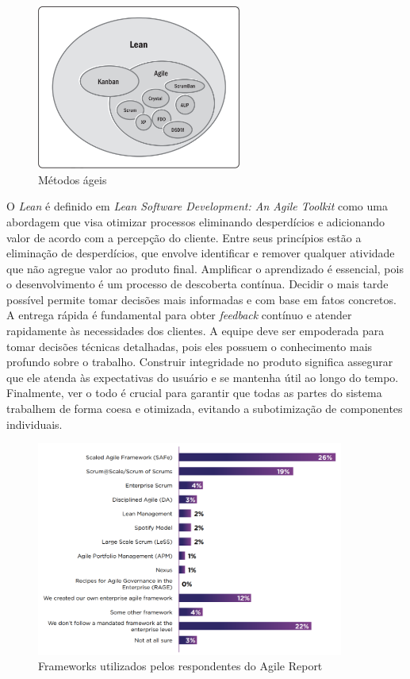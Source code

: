 \documentclass[
	12pt,
	openright,
	twoside,
	a4paper,
	english,
	brazil
	]{abntex2}
\begin{document}
\begin{figure}[H]
  \centering
	\caption{\label{metodos-ageis}Métodos ágeis}
  \includegraphics[width=0.6\textwidth]{metodos-ageis}
\end{figure}

O \textit{Lean} é definido em \textit{Lean Software Development: An Agile Toolkit} \cite{Poppendieck_Poppendieck_2003} como uma abordagem que visa otimizar processos eliminando desperdícios e adicionando valor de acordo com a percepção do cliente. Entre seus princípios estão a eliminação de desperdícios, que envolve identificar e remover qualquer atividade que não agregue valor ao produto final. Amplificar o aprendizado é essencial, pois o desenvolvimento é um processo de descoberta contínua. Decidir o mais tarde possível permite tomar decisões mais informadas e com base em fatos concretos. A entrega rápida é fundamental para obter \textit{feedback} contínuo e atender rapidamente às necessidades dos clientes. A equipe deve ser empoderada para tomar decisões técnicas detalhadas, pois eles possuem o conhecimento mais profundo sobre o trabalho. Construir integridade no produto significa assegurar que ele atenda às expectativas do usuário e se mantenha útil ao longo do tempo. Finalmente, ver o todo é crucial para garantir que todas as partes do sistema trabalhem de forma coesa e otimizada, evitando a subotimização de componentes individuais.

\begin{figure}[H]
  \centering
	\caption{\label{annual-agile-report}Frameworks utilizados pelos respondentes do Agile Report}
  \includegraphics[width=0.9\textwidth]{annual-agile-report}
\end{figure}
\end{document}
